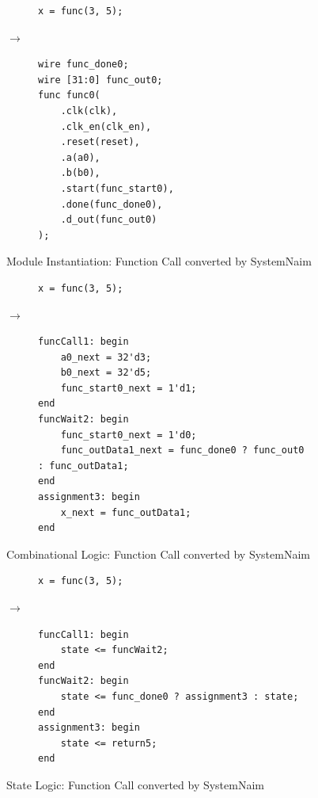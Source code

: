 \begin{figure}[H]
\centering
\begin{subfigure}{0.25\textwidth}
    \centering
    \begin{verbatim}
x = func(3, 5);
\end{verbatim}
\end{subfigure}%
{\LARGE$\rightarrow$}%
\begin{subfigure}{0.4\textwidth}
    \begin{verbatim}
wire func_done0;
wire [31:0] func_out0;
func func0(
    .clk(clk),
    .clk_en(clk_en),
    .reset(reset),
    .a(a0),
    .b(b0),
    .start(func_start0),
    .done(func_done0),
    .d_out(func_out0)
);
    \end{verbatim}
\end{subfigure}
\caption{Module Instantiation: Function Call converted by SystemNaim}
\label{sn:func_call_mdl}
\end{figure}

\begin{figure}[H]
\centering
\begin{subfigure}{0.25\textwidth}
    \centering
    \begin{verbatim}
x = func(3, 5);
\end{verbatim}
\end{subfigure}%
{\LARGE$\rightarrow$}%
\begin{subfigure}{0.55\textwidth}
    \begin{verbatim}
funcCall1: begin
    a0_next = 32'd3;
    b0_next = 32'd5;
    func_start0_next = 1'd1;
end
funcWait2: begin
    func_start0_next = 1'd0;
    func_outData1_next = func_done0 ? func_out0 : func_outData1;
end
assignment3: begin
	x_next = func_outData1;
end
    \end{verbatim}
\end{subfigure}
\caption{Combinational Logic: Function Call converted by SystemNaim}
\label{sn:func_call_comb}
\end{figure}

\begin{figure}[H]
\centering
\begin{subfigure}{0.25\textwidth}
    \centering
    \begin{verbatim}
x = func(3, 5);
\end{verbatim}
\end{subfigure}%
{\LARGE$\rightarrow$}%
\begin{subfigure}{0.55\textwidth}
    \begin{verbatim}
funcCall1: begin
    state <= funcWait2;
end
funcWait2: begin
    state <= func_done0 ? assignment3 : state;
end
assignment3: begin
	state <= return5;
end
    \end{verbatim}
\end{subfigure}
\caption{State Logic: Function Call converted by SystemNaim}
\label{sn:func_call_state}
\end{figure}

